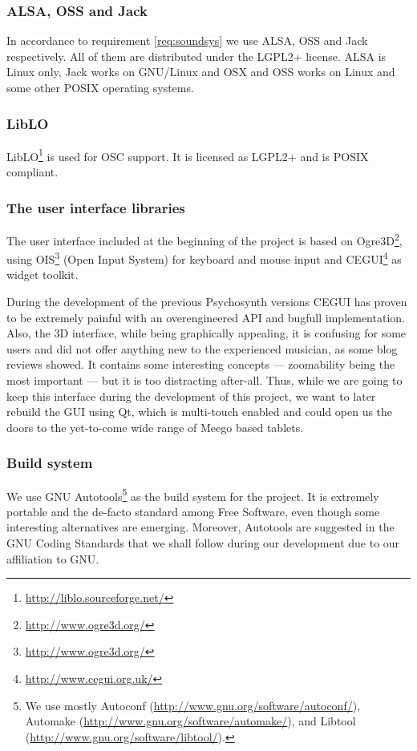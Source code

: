 \subsubsection{ALSA, OSS and Jack}

In accordance to requirement \ref{req:soundsys} we use
ALSA, OSS and Jack
respectively. All of them are distributed under the LGPL2+
license. ALSA is Linux only, Jack works on GNU/Linux and OSX and OSS
works on Linux and some other POSIX operating systems.

\subsubsection{LibLO}

LibLO\footnote{\url{http://liblo.sourceforge.net/}} is
used for OSC support. It is licensed as LGPL2+ and is POSIX compliant.

\subsubsection{The user interface libraries}

The user interface included at the beginning of the project is based
on Ogre3D\footnote{\url{http://www.ogre3d.org/}}, using
OIS\footnote{\url{http://www.ogre3d.org/}} (Open Input System) for
keyboard and mouse input and
CEGUI\footnote{\url{http://www.cegui.org.uk/}} as widget toolkit.

During the development of the previous Psychosynth versions CEGUI has
proven to be extremely painful with an overengineered API and bugfull
implementation. Also, the 3D interface, while being graphically
appealing, it is confusing for some users and did not offer anything
new to the experienced musician, as some blog reviews showed. It
contains some interesting concepts --- zoomability being the most
important --- but it is too distracting after-all. Thus, while we are
going to keep this interface during the development of this project,
we want to later rebuild the GUI using Qt, which is
multi-touch enabled and could open us the
doors to the yet-to-come wide range of Meego based tablets.

\subsubsection{Build system}

We use GNU Autotools\footnote{We use mostly Autoconf
  (\url{http://www.gnu.org/software/autoconf/}), Automake
  (\url{http://www.gnu.org/software/automake/}), and Libtool
  (\url{http://www.gnu.org/software/libtool/}).}
as the build system for the project. It is extremely portable and the
de-facto standard among Free Software, even though some interesting
alternatives are emerging. Moreover, Autotools are suggested in the
GNU Coding Standards \cite{stallman10coding} that we shall follow
during our development due to our affiliation to GNU.

